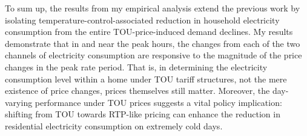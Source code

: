 To sum up, the results from my empirical analysis extend the previous work by isolating temperature-control-associated reduction in household electricity consumption from the entire TOU-price-induced demand declines. My results demonstrate that in and near the peak hours, the changes from each of the two channels of electricity consumption are responsive to the magnitude of the price changes in the peak rate period. That is, in determining the electricity consumption level within a home under TOU tariff structures, not the mere existence of price changes, prices themselves still matter. Moreover, the day-varying performance under TOU prices suggests a vital policy implication: shifting from TOU towards RTP-like pricing can enhance the reduction in residential electricity consumption on extremely cold days.
